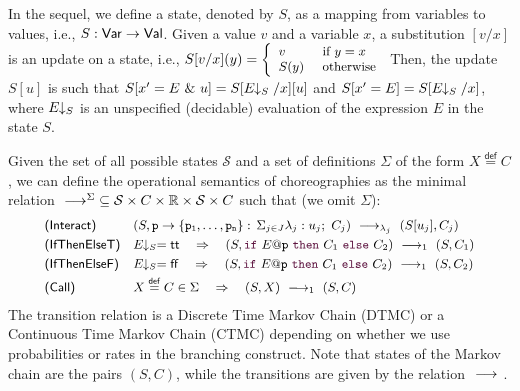 \bigskip


 In the sequel, we define a state, denoted by $S$,
as a mapping from variables to values, i.e.,
$S: \mathsf{Var} \rightarrow\mathsf{Val}$. Given a value $v$ and a variable $x$, a
substitution $[v/x]$ is an update on a state, i.e.,
$\small S[v/x] (y)= \left\{
  \begin{array}{ll} 
    v    & \text{ if } y=x\\ 
    S(y) & \text{ otherwise}
  \end{array} \right.
$
%
Then, the update $S[u]$ is such that
$S[x'=E\ \&\ u] = S[E\!\!\downarrow_{S}/x][u]$ and $S[x'=E] = S[E\!\!\downarrow_{S}/x]$,
where $E\!\!\downarrow_{S}$ is an unspecified (decidable) evaluation of the
expression $E$ in the state $S$.

Given the set of all possible states $\mathcal S$ and a set of
definitions $\Sigma$ of the form $X\stackrel{\mathsf{def}}{=} C$, we
can define the operational semantics of choreographies as the minimal
relation 
$\ \longrightarrow_{}\ \!\!\!\!^\Sigma\subseteq \mathcal S\times C\times \mathbb
R\times \mathcal S\times C$ such that (we omit $\Sigma$):
\begin{displaymath}\small
  \begin{array}{l@{\quad}llll}
    \textsf{(Interact)} &
    (S, \interact{p}{\role p_1,\ldots,\role p_n}) 
    \red{\lambda_j}
    (S[u_j], C_j) 
    \\[1mm]
    \textsf{(IfThenElseT)} &
    \eval ES = \mathsf{tt} \quad\Rightarrow\quad
    (S,\ifTE {E}{p}{C_1}{C_2}) 
    \red{1}
    (S, C_1)
    \\[1mm]
    \textsf{(IfThenElseF)} &
    \eval ES = \mathsf{ff} \quad\Rightarrow\quad
    (S,\ifTE {E}{p}{C_1}{C_2}) 
    \red{1}
    (S, C_2)
    \\[1mm]
    \textsf{(Call)} &
    X\stackrel{\mathsf{def}}{=} C\in\Sigma \quad\Rightarrow\quad (S, X) \red{1}(S,C)
  \end{array}
\end{displaymath}
The transition relation is a Discrete Time Markov Chain (DTMC) or a
Continuous Time Markov Chain (CTMC) depending on whether we use
probabilities or rates in the branching construct. Note that states of
the Markov chain are the pairs $(S,C)$, while the transitions are
given by the relation $\ \longrightarrow_{}\ $.
%

